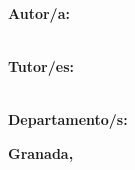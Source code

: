 \begin{titlepage}
\begin{center}
        \begin{minipage}{0.9\textwidth}
            \centering
            {\Huge \bfseries \textcolor{UGRrojo}{\@tituloTFG} \par}
        \end{minipage}

        \vfill %

        \begin{flushleft}
            \Large \textbf{Autor/a:}\\
            \@autorTFG \\
            
            \vspace{1cm}
            
            \textbf{Tutor/es:}\\
            \@tutorTFG \\
            
            \vspace{1cm}
            
            \textbf{Departamento/s:}\\
            \@departamentoTFG
        \end{flushleft}

        \vspace{1cm}

        {\large \textbf{Granada, \@convocatoriaTFG}}

    \end{center}

    \restoregeometry
\end{titlepage}
